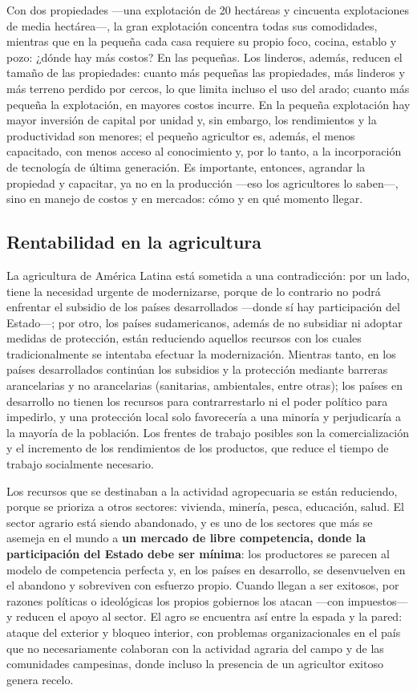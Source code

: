\documentclass[
  man,
  floatsintext,
  longtable,
  a4paper,
  nolmodern,
  notxfonts,
  notimes,
  12pt,
  colorlinks=true,linkcolor=blue,citecolor=blue,urlcolor=blue]{apa7}
\begin{document}
Con dos propiedades ---una explotación de 20 hectáreas y cincuenta
explotaciones de media hectárea---, la gran explotación concentra todas
sus comodidades, mientras que en la pequeña cada casa requiere su propio
foco, cocina, establo y pozo: ¿dónde hay más costos? En las pequeñas.
Los linderos, además, reducen el tamaño de las propiedades: cuanto más
pequeñas las propiedades, más linderos y más terreno perdido por cercos,
lo que limita incluso el uso del arado; cuanto más pequeña la
explotación, en mayores costos incurre. En la pequeña explotación hay
mayor inversión de capital por unidad y, sin embargo, los rendimientos y
la productividad son menores; el pequeño agricultor es, además, el menos
capacitado, con menos acceso al conocimiento y, por lo tanto, a la
incorporación de tecnología de última generación. Es importante,
entonces, agrandar la propiedad y capacitar, ya no en la producción
---eso los agricultores lo saben---, sino en manejo de costos y en
mercados: cómo y en qué momento llegar.

\subsection{Rentabilidad en la
agricultura}\label{rentabilidad-en-la-agricultura}

La agricultura de América Latina está sometida a una contradicción: por
un lado, tiene la necesidad urgente de modernizarse, porque de lo
contrario no podrá enfrentar el subsidio de los países desarrollados
---donde sí hay participación del Estado---; por otro, los países
sudamericanos, además de no subsidiar ni adoptar medidas de protección,
están reduciendo aquellos recursos con los cuales tradicionalmente se
intentaba efectuar la modernización. Mientras tanto, en los países
desarrollados continúan los subsidios y la protección mediante barreras
arancelarias y no arancelarias (sanitarias, ambientales, entre otras);
los países en desarrollo no tienen los recursos para contrarrestarlo ni
el poder político para impedirlo, y una protección local solo
favorecería a una minoría y perjudicaría a la mayoría de la población.
Los frentes de trabajo posibles son la comercialización y el incremento
de los rendimientos de los productos, que reduce el tiempo de trabajo
socialmente necesario.

Los recursos que se destinaban a la actividad agropecuaria se están
reduciendo, porque se prioriza a otros sectores: vivienda, minería,
pesca, educación, salud. El sector agrario está siendo abandonado, y es
uno de los sectores que más se asemeja en el mundo a \textbf{un mercado
de libre competencia, donde la participación del Estado debe ser
mínima}: los productores se parecen al modelo de competencia perfecta y,
en los países en desarrollo, se desenvuelven en el abandono y sobreviven
con esfuerzo propio. Cuando llegan a ser exitosos, por razones políticas
o ideológicas los propios gobiernos los atacan ---con impuestos--- y
reducen el apoyo al sector. El agro se encuentra así entre la espada y
la pared: ataque del exterior y bloqueo interior, con problemas
organizacionales en el país que no necesariamente colaboran con la
actividad agraria del campo y de las comunidades campesinas, donde
incluso la presencia de un agricultor exitoso genera recelo.
\end{document}
